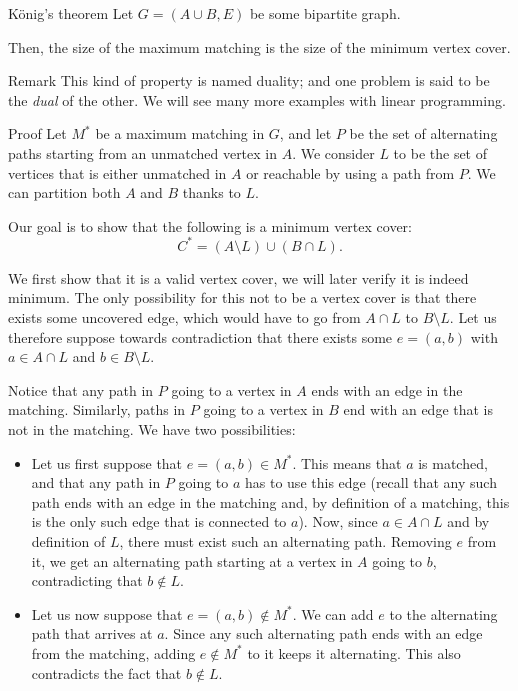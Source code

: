 \documentclass[a4paper]{article}
\begin{document}
\begin{parag}{König's theorem}
    Let $G = \left(A \cup B, E\right)$ be some bipartite graph.

    Then, the size of the maximum matching is the size of the minimum vertex cover.

    \begin{subparag}{Remark}
        This kind of property is named duality; and one problem is said to be the \textit{dual} of the other. We will see many more examples with linear programming.
    \end{subparag}

    \begin{subparag}{Proof}
        Let $M^*$ be a maximum matching in $G$, and let $P$ be the set of alternating paths starting from an unmatched vertex in $A$. We consider $L$ to be the set of vertices that is either unmatched in $A$ or reachable by using a path from $P$. We can partition both $A$ and $B$ thanks to $L$.

        Our goal is to show that the following is a minimum vertex cover: 
        \[C^* = \left(A \setminus L\right) \cup \left(B \cap L\right).\]

        We first show that it is a valid vertex cover, we will later verify it is indeed minimum. The only possibility for this not to be a vertex cover is that there exists some uncovered edge, which would have to go from $A \cap L$ to $B \setminus L$. Let us therefore suppose towards contradiction that there exists some $e = \left(a, b\right)$ with $a \in A \cap L$ and $b \in B \setminus L$. 

        Notice that any path in $P$ going to a vertex in $A$ ends with an edge in the matching. Similarly, paths in $P$ going to a vertex in $B$ end with an edge that is not in the matching. We have two possibilities:
        \begin{itemize}[left=0pt]
            \item Let us first suppose that $e = \left(a, b\right) \in M^*$. This means that $a$ is matched, and that any path in $P$ going to $a$ has to use this edge (recall that any such path ends with an edge in the matching and, by definition of a matching, this is the only such edge that is connected to $a$). Now, since $a \in A \cap L$ and by definition of $L$, there must exist such an alternating path. Removing $e$ from it, we get an alternating path starting at a vertex in $A$ going to $b$, contradicting that $b \not \in L$.
            \item Let us now suppose that $e = \left(a, b\right) \not \in M^*$. We can add $e$ to the alternating path that arrives at $a$. Since any such alternating path ends with an edge from the matching, adding $e \not\in M^*$ to it keeps it alternating. This also contradicts the fact that $b \not \in L$.
        \end{itemize}


\end{subparag}
\end{parag}
\end{document}

